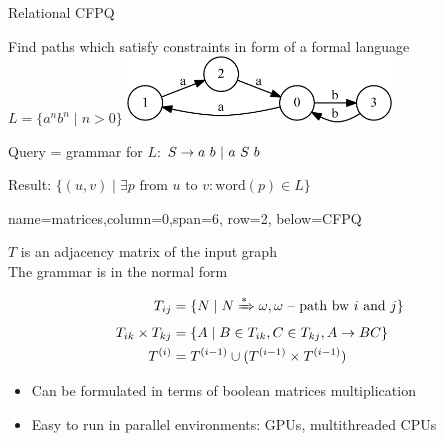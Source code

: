 \documentclass[a0paper,portrait]{baposter}
\begin{document}
\begin{poster}
\begin{posterbox}[name=CFPQ,column=0,row=0, span=4]{Relational CFPQ}

  Find paths which satisfy constraints in form of a formal language $L=\{a^n b^n \mid n > 0\}$
    \includegraphics[width=7cm]{example_graph_transparent.png}

    Query = grammar for $L$: $S  \rightarrow a  \ b \ | \ a \ S \ b  \\$

  Result: $ \{(u,v) \mid \exists p \text{ from } u \text{ to } v: \text{word}(p) \in L\} $

\end{posterbox}

{name=matrices,column=0,span=6, row=2, below=CFPQ}%
{

$T$ is an adjacency matrix of the input graph\\
The grammar is in the normal form
\vspace{-0.5cm}

\begin{align*}
T_{ij} &=\{ N \mid N \xRightarrow[]{*} \omega,  \omega \text{ -- path bw } i \text{ and } j \} \\
T_{ik} \times T_{kj} &= \{ A \mid B \in T_{ik}, C \in T_{kj}, A \rightarrow B C \} \\
T^{(i)} &= T^{(i-1)} \cup (T^{(i-1)} \times T^{(i-1)})
\end{align*}

\begin{itemize}
  \item Can be formulated in terms of boolean matrices multiplication
  \item Easy to run in parallel environments: GPUs, multithreaded CPUs
\end{itemize}
\vspace{0.1cm}
}



\end{poster}
\end{document}

